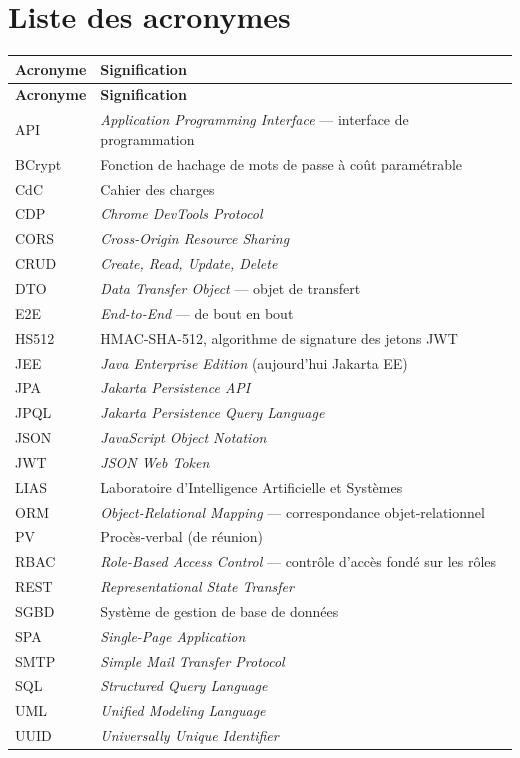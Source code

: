 \cleardoublepage
\chapter*{Liste des acronymes}

\begin{longtable}{@{}p{2.6cm}p{11.6cm}@{}}
\toprule
\textbf{Acronyme} & \textbf{Signification} \\
\midrule
\endfirsthead
\toprule
\textbf{Acronyme} & \textbf{Signification} \\
\midrule
\endhead
API      & \emph{Application Programming Interface} --- interface de programmation \\
BCrypt   & Fonction de hachage de mots de passe à coût paramétrable \\
CdC      & Cahier des charges \\
CDP      & \emph{Chrome DevTools Protocol} \\
CORS     & \emph{Cross-Origin Resource Sharing} \\
CRUD     & \emph{Create, Read, Update, Delete} \\
DTO      & \emph{Data Transfer Object} --- objet de transfert \\
E2E      & \emph{End-to-End} --- de bout en bout \\
HS512    & HMAC-SHA-512, algorithme de signature des jetons JWT \\
JEE      & \emph{Java Enterprise Edition} (aujourd'hui Jakarta EE) \\
JPA      & \emph{Jakarta Persistence API} \\
JPQL     & \emph{Jakarta Persistence Query Language} \\
JSON     & \emph{JavaScript Object Notation} \\
JWT      & \emph{JSON Web Token} \\
LIAS     & Laboratoire d'Intelligence Artificielle et Systèmes \\
ORM      & \emph{Object-Relational Mapping} --- correspondance objet-relationnel \\
PV       & Procès-verbal (de réunion) \\
RBAC     & \emph{Role-Based Access Control} --- contrôle d'accès fondé sur les rôles \\
REST     & \emph{Representational State Transfer} \\
SGBD     & Système de gestion de base de données \\
SPA      & \emph{Single-Page Application} \\
SMTP     & \emph{Simple Mail Transfer Protocol} \\
SQL      & \emph{Structured Query Language} \\
UML      & \emph{Unified Modeling Language} \\
UUID     & \emph{Universally Unique Identifier} \\
\bottomrule
\end{longtable}

\cleardoublepage
{}
\setcounter{page}{1}
\pagestyle{fancy}
